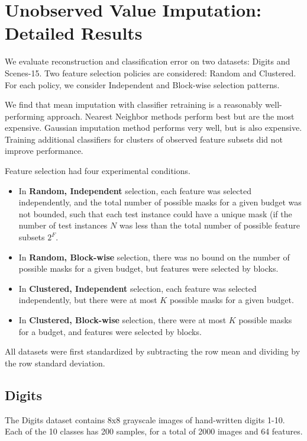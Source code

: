 \chapter{Unobserved Value Imputation: Detailed Results}\label{sec:imputation_evaluation}

We evaluate reconstruction and classification error on two datasets: Digits and Scenes-15.
Two feature selection policies are considered: Random and Clustered.
For each policy, we consider Independent and Block-wise selection patterns.

We find that mean imputation with classifier retraining is a reasonably well-performing approach.
Nearest Neighbor methods perform best but are the most expensive.
Gaussian imputation method performs very well, but is also expensive.
Training additional classifiers for clusters of observed feature subsets did not improve performance.

Feature selection had four experimental conditions.
\begin{itemize}
\item In \textbf{Random, Independent} selection, each feature was selected independently, and the total number of possible masks for a given budget was not bounded, such that each test instance could have a unique mask (if the number of test instances $N$ was less than the total number of possible feature subsets $2^F$.
\item In \textbf{Random, Block-wise} selection, there was no bound on the number of possible masks for a given budget, but features were selected by blocks.
\item In \textbf{Clustered, Independent} selection, each feature was selected independently, but there were at most $K$ possible masks for a given budget.
\item In \textbf{Clustered, Block-wise} selection, there were at most $K$ possible masks for a budget, and features were selected by blocks.
\end{itemize}

All datasets were first standardized by subtracting the row mean and dividing by the row standard deviation.

\section{Digits}
The Digits dataset contains 8x8 grayscale images of hand-written digits 1-10.
Each of the 10 classes has 200 samples, for a total of 2000 images and 64 features.

